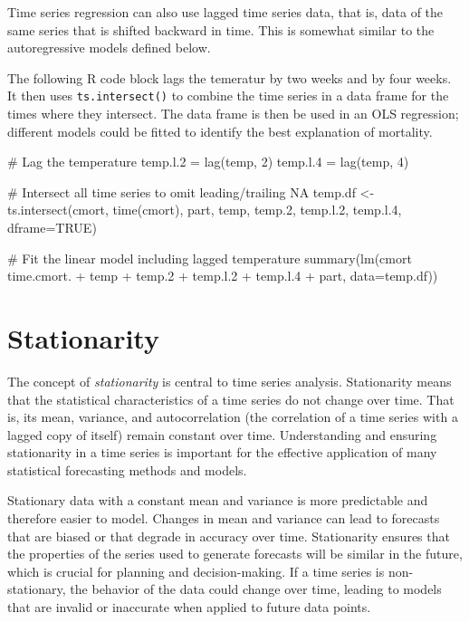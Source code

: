 Time series regression can also use lagged time series data, that is, data of the same series that is shifted backward in time. This is somewhat similar to the autoregressive models defined below. 
\begin{withcode}
The following R code block lags the temeratur by two weeks and by four weeks. It then uses \texttt{ts.intersect()} to combine the time series in a data frame for the times where they intersect. The data frame is then be used in an OLS regression; different models could be fitted to identify the best explanation of mortality.

\begin{Rcode}
# Lag the temperature
temp.l.2 = lag(temp, 2)
temp.l.4 = lag(temp, 4)

# Intersect all time series to omit leading/trailing NA
temp.df <- ts.intersect(cmort, time(cmort), part, 
                        temp, temp.2, temp.l.2, temp.l.4, 
                        dframe=TRUE)
                        
# Fit the linear model including lagged temperature
summary(lm(cmort ~ time.cmort. + temp + temp.2 + 
                   temp.l.2 + temp.l.4 + part, data=temp.df))
\end{Rcode}
\end{withcode}

\section{Stationarity}

The concept of \emph{stationarity} is central to time series analysis. Stationarity means that the statistical characteristics of a time series do not change over time. That is, its mean, variance, and autocorrelation (the correlation of a time series with a lagged copy of itself) remain constant over time. Understanding and ensuring stationarity in a time series is important for the effective application of many statistical forecasting methods and models.

Stationary data with a constant mean and variance is more predictable and therefore easier to model. Changes in mean and variance can lead to forecasts that are biased or that degrade in accuracy over time. Stationarity ensures that the properties of the series used to generate forecasts will be similar in the future, which is crucial for planning and decision-making. If a time series is non-stationary, the behavior of the data could change over time, leading to models that are invalid or inaccurate when applied to future data points.

